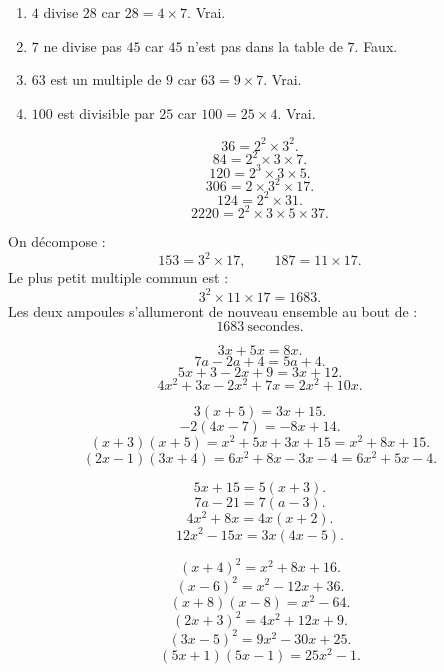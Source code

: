 \documentclass[11pt,a4paper]{article}
\newcounter{correction}
\newcommand{\encadre}[1]{\boxed{\displaystyle #1}}
\begin{document}
\begin{correction}[Arithmétique]
\begin{enumerate}[label=\alph*)]
  \item $4$ divise $28$ car $28=4\times7$. Vrai.
  \item $7$ ne divise pas $45$ car $45$ n'est pas dans la table de $7$. Faux.
  \item $63$ est un multiple de $9$ car $63=9\times7$. Vrai.
  \item $100$ est divisible par $25$ car $100=25\times4$. Vrai.
\end{enumerate}
\end{correction}

\begin{correction}[Décomposition]
\[
36=2^2\times3^2.
\]
\[
84=2^2\times3\times7.
\]
\[
120=2^3\times3\times5.
\]
\[
306=2\times3^2\times17.
\]
\[
124=2^2\times31.
\]
\[
2220=2^2\times3\times5\times37.
\]
\end{correction}

\begin{correction}[Ampoules]
On décompose :
\[
153=3^2\times17,
\qquad
187=11\times17.
\]
Le plus petit multiple commun est :
\[
3^2\times 11\times17=1683.
\]
Les deux ampoules s'allumeront de nouveau ensemble au bout de :
\[
\encadre{1683\ \text{secondes}}.
\]
\end{correction}

\begin{correction}
\[
3x+5x=8x.
\]
\[
7a-2a+4=5a+4.
\]
\[
5x+3-2x+9=3x+12.
\]
\[
4x^2+3x-2x^2+7x=2x^2+10x.
\]
\end{correction}

\begin{correction}[Développer]
\[
3(x+5)=3x+15.
\]
\[
-2(4x-7)=-8x+14.
\]
\[
(x+3)(x+5)=x^2+5x+3x+15=x^2+8x+15.
\]
\[
(2x-1)(3x+4)=6x^2+8x-3x-4=6x^2+5x-4.
\]
\end{correction}

\begin{correction}[Factoriser]
\[
5x+15=5(x+3).
\]
\[
7a-21=7(a-3).
\]
\[
4x^2+8x=4x(x+2).
\]
\[
12x^2-15x=3x(4x-5).
\]
\end{correction}

\begin{correction}
\[
(x+4)^2=x^2+8x+16.
\]
\[
(x-6)^2=x^2-12x+36.
\]
\[
(x+8)(x-8)=x^2-64.
\]
\[
(2x+3)^2=4x^2+12x+9.
\]
\[
(3x-5)^2=9x^2-30x+25.
\]
\[
(5x+1)(5x-1)=25x^2-1.
\]
\end{correction}
\end{document}
